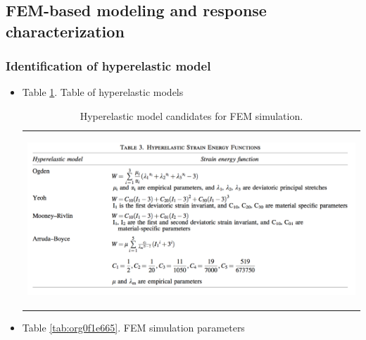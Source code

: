\documentclass[journal,onecolumn]{IEEEtran}
\begin{document}
\subsection{FEM-based modeling and response characterization}
\label{sec:orgcb620bb}

\subsubsection{Identification of hyperelastic model}
\label{sec:org91f42dd}
\begin{itemize}
\item Table \ref{tab:org95e34f9}. Table of hyperelastic models

\begin{table}[!p]
\caption{\label{tab:org95e34f9}
Hyperelastic model candidates for FEM simulation.}
\centering
\begin{tabular}{p{}}
\begin{center}
\includegraphics[width=.9\linewidth]{./fig/tab1.png}
\end{center}\\
\end{tabular}
\end{table}

\item Table \ref{tab:org0f1e665}. FEM simulation parameters


\end{itemize}
\end{document}

